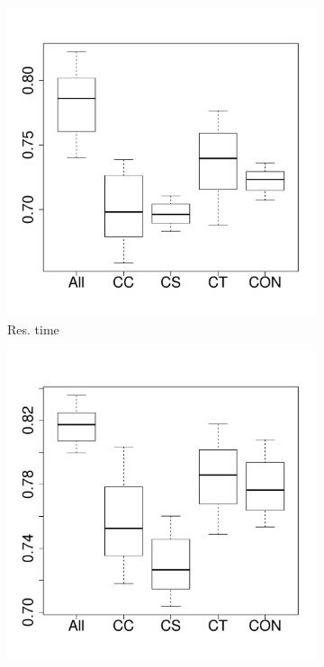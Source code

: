 \documentclass[10pt,journal,compsoc]{IEEEtran}
\begin{document}
\begin{figure}[t]
	\centering
        \begin{subfigure}{0.19\textwidth}
                \includegraphics[width=\linewidth]{Figures/runtime-cassandrakeep-importance.pdf}
                \caption{Res. time}
        \end{subfigure}%
        \begin{subfigure}{0.19\textwidth}
                \includegraphics[width=\linewidth]{Figures/cpu-cassandrakeep-importance.pdf}

\end{subfigure}
\end{figure}
\end{document}
